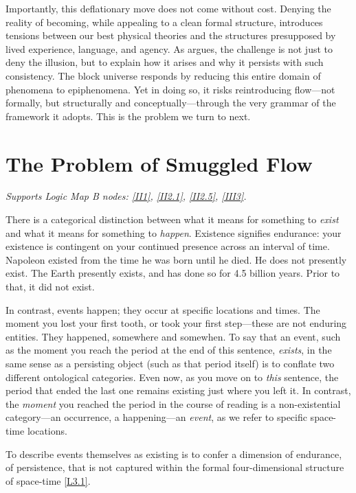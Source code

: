 \documentclass[12pt]{book}
\newcounter{logicanchor}
\newenvironment{logicanchorenv}[1]{\refstepcounter{logicanchor}\label{#1}}{}
\newcommand{\logiclink}[2]{\begin{logicanchorenv}{logic:#1}\end{logicanchorenv}\hyperref[appendix:#1]{[#1]}\xspace}
\begin{document}
Importantly, this deflationary move does not come without cost. Denying the reality of becoming, while appealing to a clean formal structure, introduces tensions between our best physical theories and the structures presupposed by lived experience, language, and agency. As \citet{maudlin2002} argues, the challenge is not just to deny the illusion, but to explain how it arises and why it persists with such consistency. The block universe responds by reducing this entire domain of phenomena to epiphenomena. Yet in doing so, it risks reintroducing flow---not formally, but structurally and conceptually---through the very grammar of the framework it adopts. This is the problem we turn to next.

\section{The Problem of Smuggled Flow}\label{sec:3.3}
\noindent\textit{Supports Logic Map B nodes: \hyperref[appendix:II1]{[II1]}, \hyperref[appendix:II2.1]{[II2.1]}, \hyperref[appendix:II2.5]{[II2.5]}, \hyperref[appendix:III3]{[III3]}.}

\vspace{4pt}

There is a categorical distinction between what it means for something to \textit{exist} and what it means for something to \textit{happen}. Existence signifies endurance: your existence is contingent on your continued presence across an interval of time. Napoleon existed from the time he was born until he died. He does not presently exist. The Earth presently exists, and has done so for 4.5 billion years. Prior to that, it did not exist.

In contrast, events happen; they occur at specific locations and times. The moment you lost your first tooth, or took your first step---these are not enduring entities. They happened, somewhere and somewhen. To say that an event, such as the moment you reach the period at the end of this sentence, \textit{exists}, in the same sense as a persisting object (such as that period itself) is to conflate two different ontological categories. Even now, as you move on to \textit{this} sentence, the period that ended the last one remains existing just where you left it. In contrast, the \textit{moment} you reached the period in the course of reading is a non-existential category---an occurrence, a happening---an \textit{event}, as we refer to specific space-time locations.

To describe events themselves as existing is to confer a dimension of endurance, of persistence, that is not captured within the formal four-dimensional structure of space-time \logiclink{L3.1}{}. 
\end{document}
